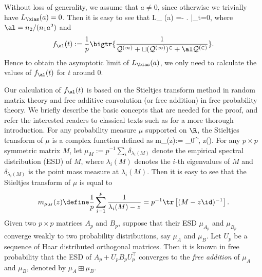 \documentclass[aos,preprint]{imsart}
\begin{document}
Without loss of generality, we assume that $a\ne 0$, since otherwise we trivially have $L_{\bias}(a)=0$. Then it is easy to see that 
\be\label{dft}
L_{\bias} (a) =-   \cdot  \left. \right|_{t=0},
\ee
where $\al= n_2/(n_1 a^2)$ and
$$f_{\al}(t):=\frac1p \bigtr{\frac{1}{\cal Q^{(1)} + t (\cal Q^{(1)})^2+ \al \cal Q^{(2)}}}.$$
Hence to obtain the asymptotic limit of $L_{\bias}(a)$, we only need to calculate the values of $f_\al(t)$ for $t$ around 0. 



 
Our calculation of $f_\al(t)$ is based on the Stieltjes transform method in random matrix theory and free additive convolution (or free addition) in free probability theory. We briefly describe the basic concepts that are needed for the proof, and refer the interested readers to classical texts such as \cite{bai2009spectral,tao2012topics,erdos2017dynamical,nica2006lectures} for a more thorough introduction.
For any probability measure $\mu$ supported on $\R$, the Stieltjes transform of $\mu$ is a complex function defined as
\be\label{def_stj}m_\mu(z):= \int_0^\infty {}, \quad {} z\in \C\setminus \supp(\mu).\ee
For any $p\times p$ symmetric matrix $M$, let $\mu_M:=p^{-1}\sum_{i} \delta_{\lambda_i(M)}$ denote the empirical spectral distribution (ESD) of $M$, where $\lambda_i(M)$ denotes the $i$-th eigenvalues of $M$ and $\delta_{\lambda_i(M)}$ is the point mass measure at $\lambda_i(M)$. Then it is easy to see that the Stieltjes transform of $\mu$ is equal to
 \[ m_{\mu_M}(z) \define \frac{1}{p}\sum_{i=1}^p \frac{1}{\lambda_i(M) - z}= p^{-1}\tr\left[(M-z\id)^{-1}\right]. \]
  Given two $p\times p$ matrices $A_p$ and $B_p$, suppose that their ESD $\mu_{A_p}$ and $\mu_{B_p}$ converge weakly to two probability distributions, say $\mu_{A}$ and $\mu_{ B}$. Let $U_p$ be a sequence of Haar distributed orthogonal matrices. Then it is known in free probability that the ESD of $ A_p + U_p B_p U_p^\top$ converges to the \emph{free addition} of $\mu_A$ and $\mu_B$, denoted by $\mu_A \boxplus \mu_B$. 
  
\end{document}
